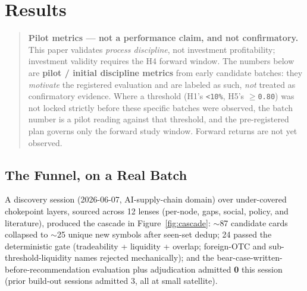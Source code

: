 \documentclass[11pt]{article}
\begin{document}
\section{Results}

\begin{quote}
\textbf{Pilot metrics --- not a performance claim, and not confirmatory.}
This paper validates \emph{process discipline}, not investment profitability;
investment validity requires the H4 forward window. The numbers below are
\textbf{pilot / initial discipline metrics} from early candidate batches: they
\emph{motivate} the registered evaluation and are labeled as such, \emph{not}
treated as confirmatory evidence. Where a threshold (H1's \texttt{<10\%}, H5's
\texttt{$\geq$0.80}) was not locked strictly before these specific batches were
observed, the batch number is a pilot reading against that threshold, and the
pre-registered plan governs only the forward study window. Forward returns are
not yet observed.
\end{quote}

\subsection{The Funnel, on a Real Batch}

A discovery session (2026-06-07, AI-supply-chain domain) over under-covered
chokepoint layers, sourced across 12 lenses (per-node, gaps, social, policy, and
literature), produced the cascade in Figure~\ref{fig:cascade}: $\sim$87 candidate
cards collapsed to $\sim$25 unique new symbols after seen-set dedup; 24 passed the
deterministic gate (tradeability + liquidity + overlap; foreign-OTC and
sub-threshold-liquidity names rejected mechanically); and the
bear-case-written-before-recommendation evaluation plus adjudication admitted
\textbf{0} this session (prior build-out sessions admitted 3, all at small
satellite).
\end{document}
